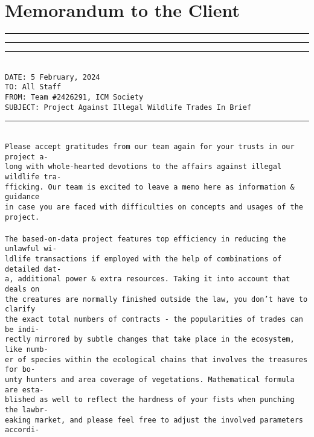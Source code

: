 \documentclass[12pt]{article}
\newcommand{\Team}{2426291}
\begin{document}
\section{Memorandum to the Client}
\hrule\hrule\hrule
\text{}\\
\texttt{\text{ }\text{ }\text{ }DATE: 5 February, 2024}\\
\texttt{\text{ }\text{ }\text{ }\text{ }\text{ }TO: All Staff}\\
\texttt{\text{ }\text{ }\text{ }FROM: Team \#\Team, ICM Society}\\
\texttt{SUBJECT: Project Against Illegal Wildlife Trades In Brief}\\
\hrule
\text{}\\
\texttt{Please accept gratitudes from our team again for your trusts in our project a-}\\
\texttt{long with whole-hearted devotions to the affairs against illegal wildlife tra-}\\
\texttt{fficking. Our team is excited to leave a memo here as information \& guidance }\\
\texttt{in case you are faced with difficulties on concepts and usages of the project.}\\
\text{}\\
\texttt{The based-on-data project features top efficiency in reducing the unlawful wi-}\\
\texttt{ldlife transactions if employed with the help of combinations of detailed dat-}\\
\texttt{a, additional power \& extra resources. Taking it into account that deals on  }\\
\texttt{the creatures are normally finished outside the law, you don't have to clarify}\\
\texttt{the exact total numbers of contracts - the popularities of trades can be indi-}\\
\texttt{rectly mirrored by subtle changes that take place in the ecosystem, like numb-}\\
\texttt{er of species within the ecological chains that involves the treasures for bo-}\\
\texttt{unty hunters and area coverage of vegetations. Mathematical formula are esta-}\\
\texttt{blished as well to reflect the hardness of your fists when punching the lawbr-}\\
\texttt{eaking market, and please feel free to adjust the involved parameters accordi-}\\
\end{document}
